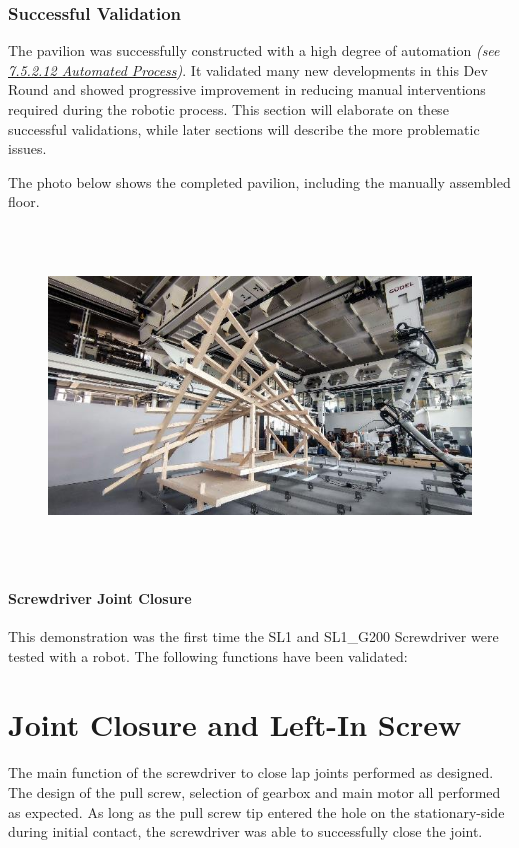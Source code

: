 \documentclass[11pt]{book}
\begin{document}
\subsubsection{Successful Validation}

The pavilion was successfully constructed with a high degree of automation \textit{(see \uline{7.5.2.12 Automated Process})}. It validated many new developments in this Dev Round and showed progressive improvement in reducing manual interventions required during the robotic process. This section will elaborate on these successful validations, while later sections will describe the more problematic issues.

The photo below shows the completed pavilion, including the manually assembled floor.

\begin{figure}[H]
\includegraphics[width=15.92cm,height=8.96cm]{./images/image18.jpeg}
\end{figure}


\paragraph{Screwdriver Joint Closure}

This demonstration was the first time the SL1 and SL1\_G200 Screwdriver were tested with a robot. The following functions have been validated:

\section{Joint Closure and Left-In Screw}

The main function of the screwdriver to close lap joints performed as designed. The design of the pull screw, selection of gearbox and main motor all performed as expected. As long as the pull screw tip entered the hole on the stationary-side during initial contact, the screwdriver was able to successfully close the joint. 
\end{document}
